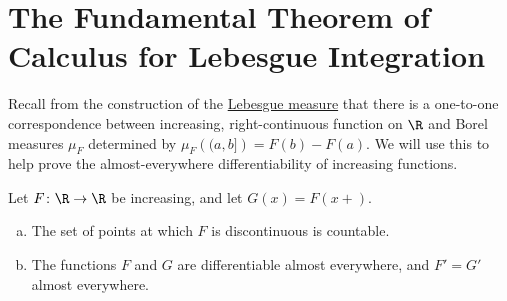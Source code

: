 \documentclass[10pt]{mypackage}
\begin{document}
\section{The Fundamental Theorem of Calculus for Lebesgue Integration}%
Recall from the construction of the \href{https://ai.avinash-iyer.com/Classes_and_Homework/After%20College/Expository%20Writings/lebesgue_measure.pdf}{Lebesgue measure} that there is a one-to-one correspondence between increasing, right-continuous function on $\R$ and Borel measures $\mu_F$ determined by $\mu_F\left( (a,b] \right) = F(b)-F(a)$. We will use this to help prove the almost-everywhere differentiability of increasing functions.
  \begin{theorem}
    Let $F\colon \R\rightarrow \R$ be increasing, and let $G(x) = F(x+)$.
    \begin{enumerate}[(a)]
      \item The set of points at which $F$ is discontinuous is countable.
      \item The functions $F$ and $G$ are differentiable almost everywhere, and $F' = G'$ almost everywhere.
    \end{enumerate}
  \end{theorem}
\end{document}
